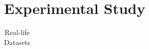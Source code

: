 \section{Experimental Study}
\label{sec-expt}


\begin{table}[t!]
\begin{center}
\begin{scriptsize}
\caption{Real-life Datasets}\label{tab-datasets}
\vspace{-2ex}
\begin{tabular}{|c||c|c|c|}%
\hline



\end{tabular}
\end{scriptsize}
\end{center}
\end{table}
